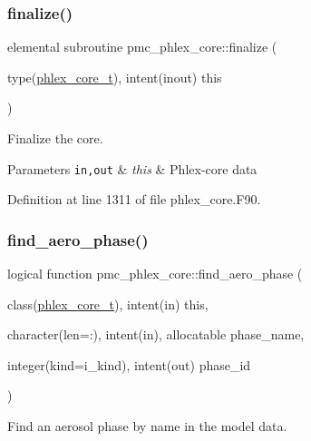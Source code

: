 \subsubsection{\texorpdfstring{finalize()}{finalize()}}
{\footnotesize\ttfamily elemental subroutine pmc\+\_\+phlex\+\_\+core\+::finalize (\begin{DoxyParamCaption}\item[{type(\mbox{\hyperlink{structpmc__phlex__core_1_1phlex__core__t}{phlex\+\_\+core\+\_\+t}}), intent(inout)}]{this }\end{DoxyParamCaption})\hspace{0.3cm}{\ttfamily [private]}}



Finalize the core. 


\begin{DoxyParams}[1]{Parameters}
\mbox{\tt in,out}  & {\em this} & Phlex-\/core data \\
\hline
\end{DoxyParams}


Definition at line 1311 of file phlex\+\_\+core.\+F90.

\mbox{\label{namespacepmc__phlex__core_a3405caf8619aee5c8c8b485a7c4656c7}} 
\subsubsection{\texorpdfstring{find\+\_\+aero\+\_\+phase()}{find\_aero\_phase()}}
{\footnotesize\ttfamily logical function pmc\+\_\+phlex\+\_\+core\+::find\+\_\+aero\+\_\+phase (\begin{DoxyParamCaption}\item[{class(\mbox{\hyperlink{structpmc__phlex__core_1_1phlex__core__t}{phlex\+\_\+core\+\_\+t}}), intent(in)}]{this,  }\item[{character(len=\+:), intent(in), allocatable}]{phase\+\_\+name,  }\item[{integer(kind=i\+\_\+kind), intent(out)}]{phase\+\_\+id }\end{DoxyParamCaption})\hspace{0.3cm}{\ttfamily [private]}}



Find an aerosol phase by name in the model data. 


